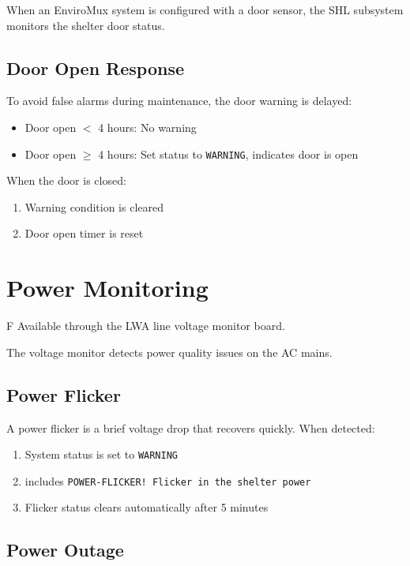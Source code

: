 When an EnviroMux system is configured with a door sensor, the SHL subsystem monitors the shelter door status.

\subsection{Door Open Response}

To avoid false alarms during maintenance, the door warning is delayed:
\begin{itemize}
    \item Door open $<$ 4 hours: No warning
    \item Door open $\geq$ 4 hours: Set status to \texttt{WARNING},  indicates door is open
\end{itemize}

When the door is closed:
\begin{enumerate}
    \item Warning condition is cleared
    \item Door open timer is reset
\end{enumerate}

\section{Power Monitoring}

\begin{newInVersion}{F}
Available through the LWA line voltage monitor board.
\end{newInVersion}

The voltage monitor detects power quality issues on the AC mains.

\subsection{Power Flicker}

A power flicker is a brief voltage drop that recovers quickly. When detected:
\begin{enumerate}
    \item System status is set to \texttt{WARNING}
    \item {} includes \texttt{POWER-FLICKER! Flicker in the shelter power}
    \item Flicker status clears automatically after 5 minutes
\end{enumerate}

\subsection{Power Outage}

